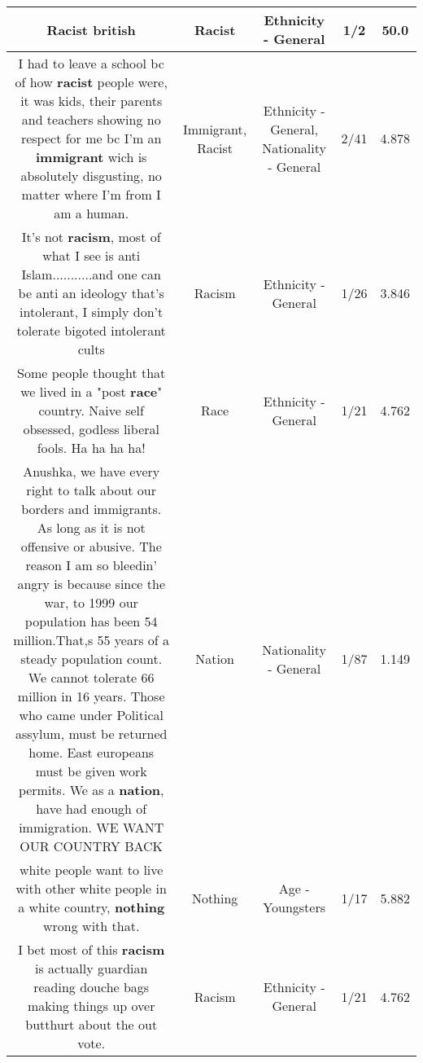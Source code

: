 \documentclass[11pt]{article}
\newlength\mylength
\begin{document}
\begin{center}
\begin{longtable}{|C{.65\mylength}|C{.30\mylength}|C{.12\mylength}|C{.12\mylength}|C{.12\mylength}|}
  \small Racist british\normalsize   & Racist & Ethnicity - General & 1/2 & 50.0 \\  \hline
  \small I had to leave a school bc of how \textbf{racist} people were, it was kids, their parents and teachers showing no respect for me bc I'm an \textbf{immigrant} wich is absolutely disgusting, no matter where I'm from I am a human.\normalsize   & Immigrant, Racist & Ethnicity - General, Nationality - General & 2/41 & 4.878 \\  \hline
  \small It's not \textbf{racism}, most of what I see is anti Islam...........and one can be anti an ideology that's intolerant, I simply don't tolerate bigoted intolerant  cults\normalsize   & Racism & Ethnicity - General & 1/26 & 3.846 \\  \hline
  \small Some people thought that we lived in a "post \textbf{race}" country. Naive self obsessed, godless liberal fools. Ha ha ha ha!\normalsize   & Race & Ethnicity - General & 1/21 & 4.762 \\  \hline
  \small Anushka, we have every right to talk about our borders and immigrants. As long as it is not offensive or abusive. The reason I am so bleedin' angry is because since the war, to 1999 our population has been 54 million.That,s 55 years of a steady population count. We cannot tolerate 66 million in 16 years. Those who came under Political assylum, must be returned home. East europeans must be given work permits. We as a \textbf{nation}, have had enough of immigration. WE WANT OUR COUNTRY BACK\normalsize   & Nation & Nationality - General & 1/87 & 1.149 \\  \hline
  \small white people want to live with other white people in a white country, \textbf{nothing} wrong with that.\normalsize   & Nothing & Age - Youngsters & 1/17 & 5.882 \\  \hline
  \small I bet most of this \textbf{racism} is actually guardian reading douche bags making things up over butthurt about the out vote.\normalsize   & Racism & Ethnicity - General & 1/21 & 4.762 \\  \hline

\end{longtable}
\end{center}
\end{document}
